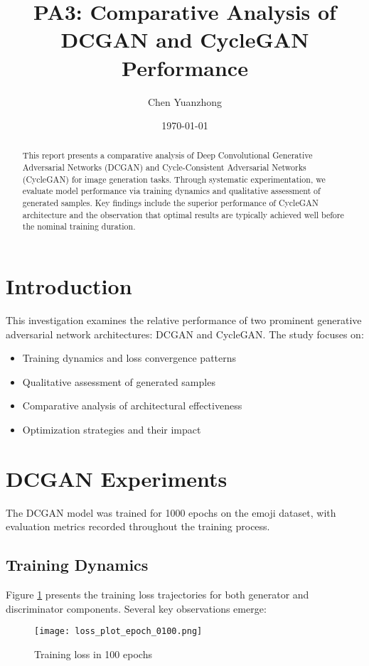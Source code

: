 \documentclass{article}
\title{PA3: Comparative Analysis of DCGAN and CycleGAN Performance}
\author{Chen Yuanzhong}
\date{\today}
\begin{document}
\maketitle

\begin{abstract}
This report presents a comparative analysis of Deep Convolutional Generative Adversarial Networks (DCGAN) and Cycle-Consistent Adversarial Networks (CycleGAN) for image generation tasks. Through systematic experimentation, we evaluate model performance via training dynamics and qualitative assessment of generated samples. Key findings include the superior performance of CycleGAN architecture and the observation that optimal results are typically achieved well before the nominal training duration.
\end{abstract}

\section{Introduction}
This investigation examines the relative performance of two prominent generative adversarial network architectures: DCGAN and CycleGAN. The study focuses on:
\begin{itemize}
\item Training dynamics and loss convergence patterns
\item Qualitative assessment of generated samples
\item Comparative analysis of architectural effectiveness
\item Optimization strategies and their impact
\end{itemize}

\section{DCGAN Experiments}
The DCGAN model was trained for 1000 epochs on the emoji dataset, with evaluation metrics recorded throughout the training process.

\subsection{Training Dynamics}
Figure \ref{fig:Training loss in 100 epochs} presents the training loss trajectories for both generator and discriminator components. Several key observations emerge:

\begin{figure}[H]
    \centering
    \texttt{[image: loss\_plot\_epoch\_0100.png]}
    \caption{Training loss in 100 epochs}
    \label{fig:Training loss in 100 epochs}
\end{figure}
\end{document}
